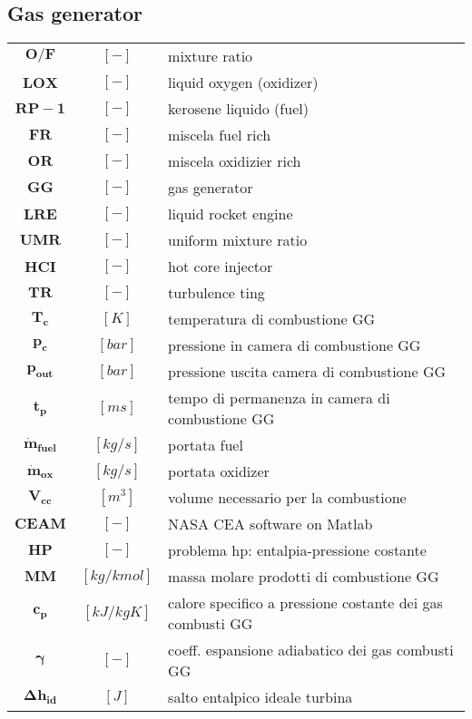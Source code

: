 \begin{multicols}{2}
	\subsection{Gas generator}
	\begin{tabularx}{\linewidth}{ccX}
		$\bm{O/F}$ & $[-]$ & mixture ratio \\
		$\bm{LOX}$ & $[-]$ & liquid oxygen (oxidizer)\\
		$\bm{RP-1}$ & $[-]$ & kerosene liquido (fuel) \\
		$\bm{FR}$ & $[-]$ & miscela fuel rich\\
		$\bm{OR}$ & $[-]$ & miscela oxidizier rich\\
		$\bm{GG}$ & $[-]$ & gas generator\\
		$\bm{LRE}$ & $[-]$ & liquid rocket engine\\
		$\bm{UMR}$ & $[-]$ & uniform mixture ratio\\
		$\bm{HCI}$ & $[-]$ & hot core injector\\
		$\bm{TR}$ & $[-]$ & turbulence ting\\
		$\bm{T_c}$ & $[K]$ & temperatura di combustione GG\\
		$\bm{p_c}$ & $[bar]$ & pressione in camera di combustione GG\\
		$\bm{p_{out}}$ & $[bar]$ & pressione uscita camera di combustione GG\\
		$\bm{t_p}$ & $[ms]$ & tempo di permanenza in camera di combustione GG\\
		$\bm{\dot{m}_{fuel}}$ & $[kg/s]$ & portata fuel\\
		$\bm{\dot{m}_{ox}}$ & $[kg/s]$ & portata oxidizer\\
		$\bm{V_{cc}}$ & $[m^3]$ & volume necessario per la combustione\\
		$\bm{CEAM}$ & $[-]$ & NASA CEA software on Matlab\\
		$\bm{HP}$ & $[-]$ & problema hp: entalpia-pressione costante\\
		$\bm{MM}$ & $[kg/kmol]$ & massa molare prodotti di combustione GG\\
		$\bm{c_p}$ & $[kJ/kgK]$ & calore specifico a pressione costante dei gas combusti GG\\
		$\bm{\gamma}$ & $[-]$ & coeff. espansione adiabatico dei gas combusti GG\\
		$\bm{\Delta h_{id}}$ & $[J]$ & salto entalpico ideale turbina
	\end{tabularx}
	

\end{multicols}
